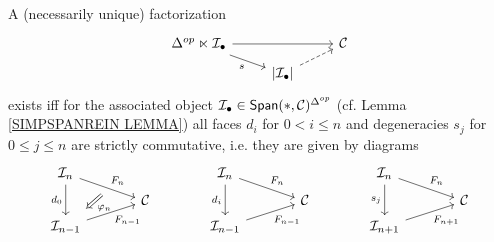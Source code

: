 \documentclass[a4paper,10pt]{article}%
\begin{document}
\begin{lemma}\label{SOURCEFACT LEM}
	A (necessarily unique) factorization
\begin{equation}\label{SOURCEFACT EQ}
	\begin{tikzcd}[row sep = 0.5em]
	\Delta^{op} \ltimes \mcI_{\bullet} \ar{rr} \ar{rd}[swap]{s}& & \C \\
	& \left|\mcI_{\bullet}\right| \ar[dashed]{ru}
	\end{tikzcd}
\end{equation}
	exists iff for the associated object 
	$\mcI_{\bullet} \in \mathsf{Span}(\**,\C)^{\Delta^{op}}$
	(cf. Lemma \ref{SIMPSPANREIN LEMMA})
	all faces $d_i$ for $0<i\leq n$ and degeneracies $s_j$ for $0\leq j \leq n$ are strictly commutative, i.e. they are given by diagrams
\begin{equation}\label{IDENTSIMPRELS EQ}
	\begin{tikzcd}[row sep=0.4em,column sep = 3.5em]
		\mathcal{I}_n
		\ar{dr}[name=F1]{F_n} \ar{dd}[swap]{d_0} & &
		\mathcal{I}_n
		\ar{dr}{F_n} \ar{dd}[swap]{d_i} & &
		\mathcal{I}_n
		\ar{dr}{F_n} \ar{dd}[swap]{s_j} &
	\\
 & \C & & \C & & \C
	\\
|[alias=G2]| \mathcal{I}_{n-1}  \ar{ur}[swap]{F_{n-1}} & & 
 \mathcal{I}_{n-1}  \ar{ur}[swap]{F_{n-1}} & &
 \mathcal{I}_{n+1}  \ar{ur}[swap]{F_{n+1}} &
		\arrow[Rightarrow, from=F1, to=G2,shorten >=0.25cm,shorten <=0.25cm,"\varphi_n"]
	\end{tikzcd}
\end{equation}
\end{lemma}
\end{document}
